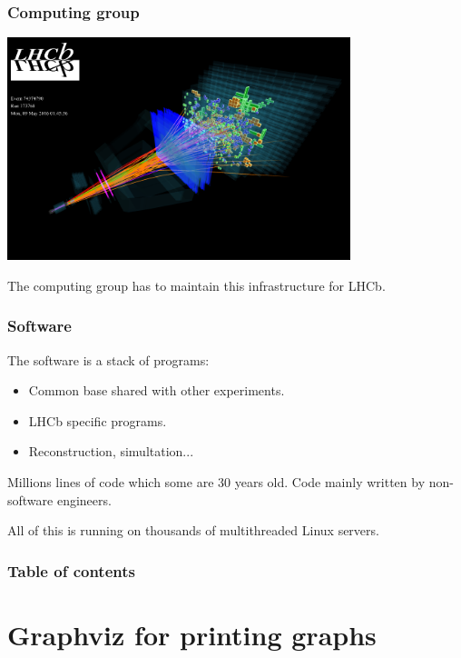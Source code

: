 \documentclass{beamer}
\begin{document}
\begin{frame}
    \frametitle{Computing group}

    \includegraphics[width=0.75\textwidth]{LHCb_3D.png}

    The computing group has to maintain this infrastructure for LHCb.
\end{frame}

\begin{frame}
    \frametitle{Software}

    The software is a stack of programs:

    \begin{itemize}
        \item Common base shared with other experiments.
        \item LHCb specific programs.
        \item Reconstruction, simultation...
    \end{itemize}

    Millions lines of code which some are 30 years old.
    Code mainly written by non-software engineers.

    All of this is running on thousands of multithreaded Linux servers.
\end{frame}

\begin{frame}
    \frametitle{Table of contents}
    \tableofcontents
\end{frame}

\section{Graphviz for printing graphs}

\begin{frame}
    \tableofcontents[currentsection]
\end{frame}
\end{document}
